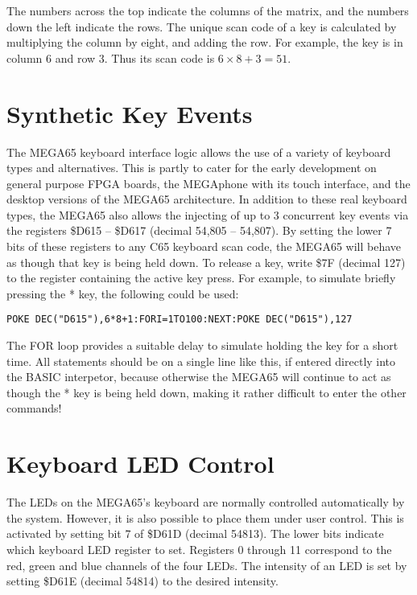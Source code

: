 The numbers across the top indicate the columns of the matrix, and the numbers down the left indicate the rows.
The unique scan code of a key is calculated by multiplying the column by eight, and adding the row.  For example,
the  key is in column 6 and row 3. Thus its scan code is $6 \times 8 + 3 = 51$.

\section{Synthetic Key Events}

The MEGA65 keyboard interface logic allows the use of a variety of keyboard types and alternatives. This is partly
to cater for the early development on general purpose FPGA boards, the MEGAphone with its touch interface, and the
desktop versions of the MEGA65 architecture.  In addition to these real keyboard types, the MEGA65 also allows the
injecting of up to 3 concurrent key events via the registers \$D615 -- \$D617 (decimal 54,805 -- 54,807).  By setting the
lower 7 bits of these registers to any C65 keyboard scan code, the MEGA65 will behave as though that key is being
held down.  To release a key, write \$7F (decimal 127) to the register containing the active key press. For example,
to simulate briefly pressing the * key, the following could be used:

\begin{tcolorbox}[colback=black,coltext=white]
\verbatimfont{\codefont}
\begin{verbatim}
POKE DEC("D615"),6*8+1:FORI=1TO100:NEXT:POKE DEC("D615"),127
\end{verbatim}
\end{tcolorbox}

The FOR loop provides a suitable delay to simulate holding the key for a short time.  All statements should be on a single line
like this, if entered directly into the BASIC interpetor, because otherwise the MEGA65 will continue to act as though the * key
is being held down, making it rather difficult to enter the other commands!

\section{Keyboard LED Control}

The LEDs on the MEGA65's keyboard are normally controlled automatically
by the system.  However, it is also possible to place them under
user control.  This is activated by setting bit 7 of \$D61D (decimal 54813).
The lower bits indicate which keyboard LED register to set.  Registers 0 through 11
correspond to the red, green and blue channels of the four LEDs.  The intensity
of an LED is set by setting \$D61E (decimal 54814) to the desired intensity.

